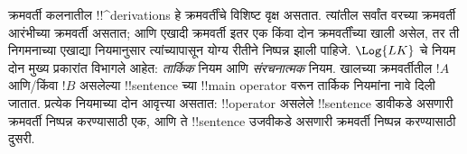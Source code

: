 \documentclass[../../../include/open-logic-section]{subfiles}
\begin{document}
क्रमवर्ती कलनातील !!^{derivation}s हे क्रमवर्तींचे विशिष्ट वृक्ष असतात.
त्यांतील सर्वांत वरच्या क्रमवर्ती आरंभीच्या क्रमवर्ती असतात; आणि एखादी
क्रमवर्ती इतर एक किंवा दोन क्रमवर्तींच्या खाली असेल, तर ती निगमनाच्या
एखाद्या नियमानुसार त्यांच्यापासून योग्य रीतीने निष्पन्न झाली पाहिजे.
$\Log{LK}$ चे नियम दोन मुख्य प्रकारांत विभागले आहेत: \emph{तार्किक} नियम
आणि \emph{संरचनात्मक} नियम. खालच्या क्रमवर्तीतील $!A$ आणि/किंवा $!B$
असलेल्या !!{sentence} च्या !!{main
  operator} वरून तार्किक नियमांना नावे दिली
जातात. प्रत्येक नियमाच्या दोन आवृत्त्या असतात: !!{operator} असलेले
!!{sentence} डावीकडे असणारी क्रमवर्ती निष्पन्न करण्यासाठी एक, आणि ते
!!{sentence} उजवीकडे असणारी क्रमवर्ती निष्पन्न करण्यासाठी दुसरी.
\end{document}
